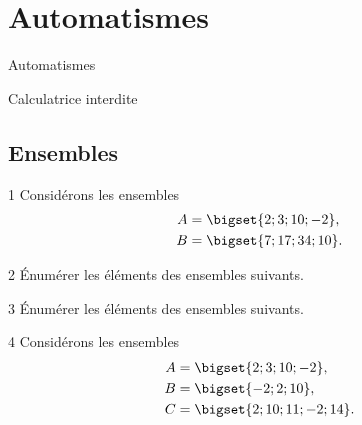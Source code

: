 
\AdvanceDate[1]



\section{Automatismes}

\begin{frame}

\centering \huge
Automatismes

\large
Calculatrice interdite

\end{frame}

\subsection{Ensembles}

\begin{frame}{1\vspace{-32pt}}
	Considérons les ensembles 
		\begin{align*}
			A &= \bigset{ 2 ; 3 ; 10 ; -2}, \\
			B &= \bigset{ 7 ; 17 ; 34 ; 10}.
		\end{align*}
\end{frame}

\begin{frame}{2\vspace{-32pt}}
	Énumérer les éléments des ensembles suivants.
\end{frame}

\begin{frame}{3\vspace{-32pt}}
	Énumérer les éléments des ensembles suivants.
\end{frame}

\begin{frame}{4\vspace{-32pt}}
	Considérons les ensembles 
		\begin{align*}
			A &= \bigset{ 2 ; 3 ; 10 ; -2}, \\
			B &= \bigset{ -2 ; 2 ; 10}, \\ 
			C &= \bigset{2 ; 10 ; 11 ; -2 ; 14}.
		\end{align*}
	\vspace{-10pt}
\end{frame}

